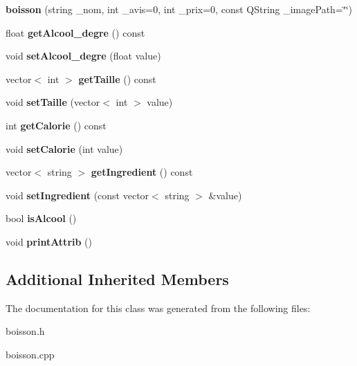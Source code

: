 \begin{DoxyCompactItemize}
\item 
{\bfseries boisson} (string \+\_\+nom, int \+\_\+avis=0, int \+\_\+prix=0, const Q\+String \+\_\+image\+Path=\char`\"{}\char`\"{})\hypertarget{classboisson_a9a0fb36038dd58079e657c08c0f24063}{}\label{classboisson_a9a0fb36038dd58079e657c08c0f24063}

\item 
float {\bfseries get\+Alcool\+\_\+degre} () const \hypertarget{classboisson_ad348f3df94927060866925e1e1b1b614}{}\label{classboisson_ad348f3df94927060866925e1e1b1b614}

\item 
void {\bfseries set\+Alcool\+\_\+degre} (float value)\hypertarget{classboisson_abeee81dcdb0f326cd02c841bc8027469}{}\label{classboisson_abeee81dcdb0f326cd02c841bc8027469}

\item 
vector$<$ int $>$ {\bfseries get\+Taille} () const \hypertarget{classboisson_a8d7778f4cf2830b8c504369b3ce15282}{}\label{classboisson_a8d7778f4cf2830b8c504369b3ce15282}

\item 
void {\bfseries set\+Taille} (vector$<$ int $>$ value)\hypertarget{classboisson_a7a7d8042ee2c4c393386df567846eca0}{}\label{classboisson_a7a7d8042ee2c4c393386df567846eca0}

\item 
int {\bfseries get\+Calorie} () const \hypertarget{classboisson_a881251d7b0f9fe313a176400d797bcd3}{}\label{classboisson_a881251d7b0f9fe313a176400d797bcd3}

\item 
void {\bfseries set\+Calorie} (int value)\hypertarget{classboisson_ad56ba9b89833b58895930a590c9ab728}{}\label{classboisson_ad56ba9b89833b58895930a590c9ab728}

\item 
vector$<$ string $>$ {\bfseries get\+Ingredient} () const \hypertarget{classboisson_abe53a0e07c85f529edf06025be68428a}{}\label{classboisson_abe53a0e07c85f529edf06025be68428a}

\item 
void {\bfseries set\+Ingredient} (const vector$<$ string $>$ \&value)\hypertarget{classboisson_afed64ee2018eaf6879297c4470a3b97b}{}\label{classboisson_afed64ee2018eaf6879297c4470a3b97b}

\item 
bool {\bfseries is\+Alcool} ()\hypertarget{classboisson_a42a2dcfb3e56acd9e19b39c575ba06a5}{}\label{classboisson_a42a2dcfb3e56acd9e19b39c575ba06a5}

\item 
void {\bfseries print\+Attrib} ()\hypertarget{classboisson_aad88a1ac4518a46acbc530f5e4b0e9a5}{}\label{classboisson_aad88a1ac4518a46acbc530f5e4b0e9a5}

\end{DoxyCompactItemize}
\subsection*{Additional Inherited Members}


The documentation for this class was generated from the following files\+:\begin{DoxyCompactItemize}
\item 
boisson.\+h\item 
boisson.\+cpp\end{DoxyCompactItemize}
